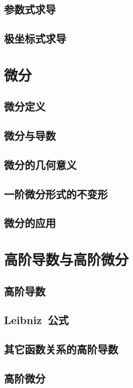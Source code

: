 \subsection{参数式求导}
\subsection{极坐标式求导}
\begin{exercise}

\end{exercise}
\section{微\emspace 分}
\subsection{微分定义}
\subsection{微分与导数}
\subsection{微分的几何意义}
\subsection{一阶微分形式的不变形}
\subsection{微分的应用}
\begin{exercise}

\end{exercise}
\section{高阶导数与高阶微分}
\subsection{高阶导数}
\subsection{Leibniz~公式}
\subsection{其它函数关系的高阶导数}
\subsection{高阶微分}
\begin{exercise}

\end{exercise}
\begin{exercise*}

\end{exercise*}


\endinput
